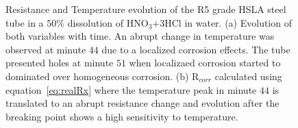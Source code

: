 \documentclass[journal,twoside,web]{ieeecolor}
\begin{document}
\begin{figure}[!t]
\centering
{}
\caption{Resistance and Temperature evolution of the R5 grade HSLA steel tube in a $50\%$ dissolution of HNO$_{3}$+$3$HCl in water. (a) Evolution of both variables with time. An abrupt change in temperature was observed at minute $44$ due to a localized corrosion effects. The tube presented holes at minute $51$ when localizaed corrosion started to dominated over homogeneous corrosion. (b) R$_{corr}$ calculated using equation~\ref{eq:realRx} where the temperature peak in minute $44$ is translated to an abrupt resistance change and evolution after the breaking point shows a high sensitivity to temperature.}
\label{fig:aqRegiaResults}
\end{figure} 
\end{document}
